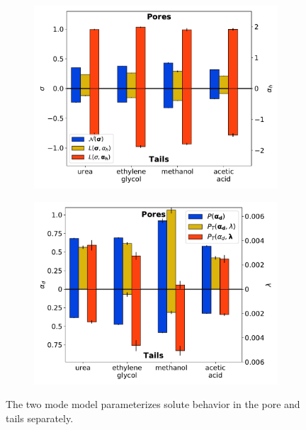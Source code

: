 \documentclass{article}
\begin{document}
  \begin{figure}
  \centering
  \begin{subfigure}{0.475\textwidth}
  \includegraphics[width=\textwidth]{2mode_AD_hops.pdf}
  \caption{}\label{fig:2mode_AD_hops}
  \end{subfigure}
  \begin{subfigure}{0.475\textwidth}
  \includegraphics[width=\textwidth]{2mode_AD_dwells.pdf}
  \caption{}\label{fig:2mode_AD_dwells}
  \end{subfigure}
  \caption{
  The two mode model parameterizes solute behavior in the pore and tails separately.
}
\end{figure}
\end{document}
